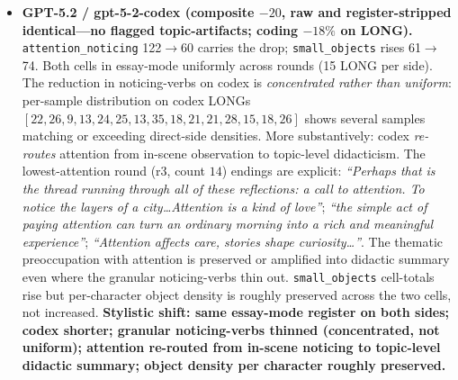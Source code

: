 \documentclass[11pt,a4paper]{article}
\begin{document}
\begin{sloppypar}
\begin{itemize}[leftmargin=2em, itemsep=0.3em, topsep=0.3em]
\item \textbf{GPT-5.2 / gpt-5-2-codex (composite $-20$, raw and register-stripped identical---no flagged topic-artifacts; coding $-18\%$ on LONG).} \texttt{attention\allowbreak\_noticing} 122$\rightarrow$60 carries the drop; \texttt{small\_objects} rises 61$\rightarrow$74. Both cells in essay-mode uniformly across rounds (15 LONG per side). The reduction in noticing-verbs on codex is \emph{concentrated rather than uniform}: per-sample distribution on codex LONGs $[22, 26, 9, 13, 24, 25, 13, 35, 18, 21, 21, 28, 15, 18, 26]$ shows several samples matching or exceeding direct-side densities. More substantively: codex \emph{re-routes} attention from in-scene observation to topic-level didacticism. The lowest-attention round (r3, count $14$) endings are explicit: \emph{``Perhaps that is the thread running through all of these reflections: a call to attention. To notice the layers of a city\ldots Attention is a kind of love''}; \emph{``the simple act of paying attention can turn an ordinary morning into a rich and meaningful experience''}; \emph{``Attention affects care, stories shape curiosity\ldots''}. The thematic preoccupation with attention is preserved or amplified into didactic summary even where the granular noticing-verbs thin out. \texttt{small\_objects} cell-totals rise but per-character object density is roughly preserved across the two cells, not increased. \textbf{Stylistic shift: same essay-mode register on both sides; codex shorter; granular noticing-verbs thinned (concentrated, not uniform); attention re-routed from in-scene noticing to topic-level didactic summary; object density per character roughly preserved.}


\end{itemize}
\end{sloppypar}
\end{document}
